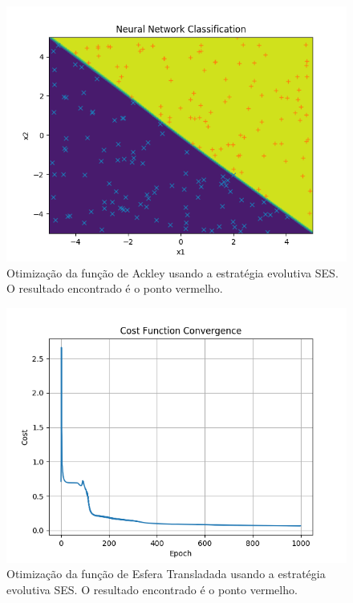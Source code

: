\documentclass[conference]{IEEEtran}
\begin{document}
\begin{figure}[htbp]
\centering
\centerline{\includegraphics[scale=0.5]{imagens/sum_gt_zero/neural_net_classification.png}}
\caption{Otimização da função de Ackley usando a estratégia evolutiva SES. O resultado encontrado é o ponto vermelho.}
\label{sum_gt_zero/neural_net_classification}
\end{figure} 

\begin{figure}[htbp]
\centering
\centerline{\includegraphics[scale=0.5]{imagens/xor/cost_function_convergence.png}}
\caption{Otimização da função de Esfera Transladada usando a estratégia evolutiva SES. O resultado encontrado é o ponto vermelho.}
\label{xor/cost_function_convergence}
\end{figure}
\end{document}
